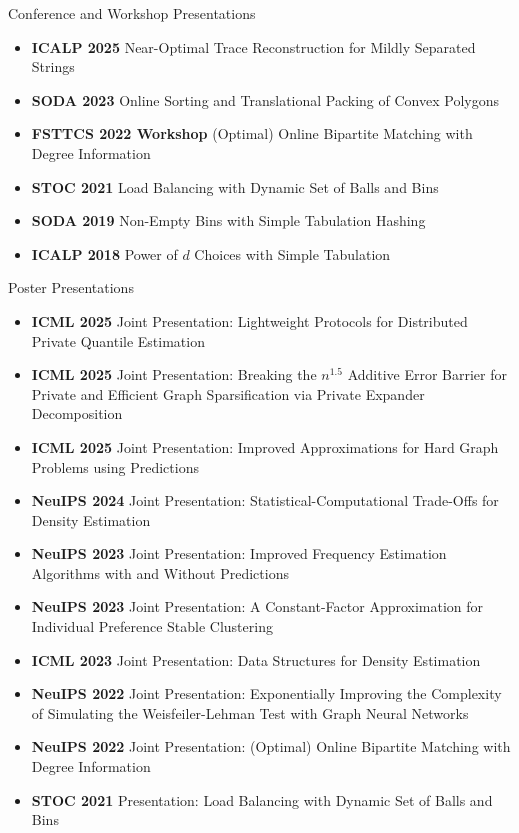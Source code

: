 \documentclass{resume} %
\begin{document}
 
 
 
 \begin{rSection}{Conference and Workshop Presentations}
 \begin{itemize}
 \item \textbf{ICALP 2025} Near-Optimal Trace Reconstruction for Mildly Separated Strings
 \item  \textbf{SODA 2023}  Online Sorting and Translational Packing of Convex Polygons
 \item \textbf{FSTTCS 2022 Workshop}  (Optimal) Online Bipartite Matching with Degree Information
 \item \textbf{STOC 2021}  Load Balancing with Dynamic Set of Balls and Bins
 \item \textbf{SODA 2019} Non-Empty Bins with Simple Tabulation Hashing
 \item  \textbf{ICALP 2018}  Power of $d$ Choices with Simple Tabulation
 \end{itemize}
 \end{rSection}
 
  \begin{rSection}{Poster Presentations}
 \begin{itemize}
  \item  \textbf{ICML 2025} Joint Presentation: Lightweight Protocols for Distributed Private Quantile Estimation
  \item  \textbf{ICML 2025} Joint Presentation: Breaking the $n^{1.5}$ Additive Error Barrier for Private and Efficient Graph Sparsification via Private Expander Decomposition
  \item  \textbf{ICML 2025} Joint Presentation: Improved Approximations for Hard Graph Problems using Predictions
  \item  \textbf{NeuIPS 2024} Joint Presentation: Statistical-Computational Trade-Offs for Density Estimation
  \item  \textbf{NeuIPS 2023} Joint Presentation: Improved Frequency Estimation Algorithms with and Without Predictions
  \item  \textbf{NeuIPS 2023} Joint Presentation: A Constant-Factor Approximation for Individual Preference Stable Clustering
  \item  \textbf{ICML 2023} Joint Presentation: Data Structures for Density Estimation
  \item  \textbf{NeuIPS 2022} Joint Presentation: Exponentially Improving the Complexity of Simulating the Weisfeiler-Lehman Test with
Graph Neural Networks
  \item  \textbf{NeuIPS 2022} Joint Presentation: (Optimal) Online Bipartite Matching with Degree Information
  \item  \textbf{STOC 2021} Presentation: Load Balancing with Dynamic Set of Balls and Bins
 \end{itemize}
 \end{rSection}
\end{document}
